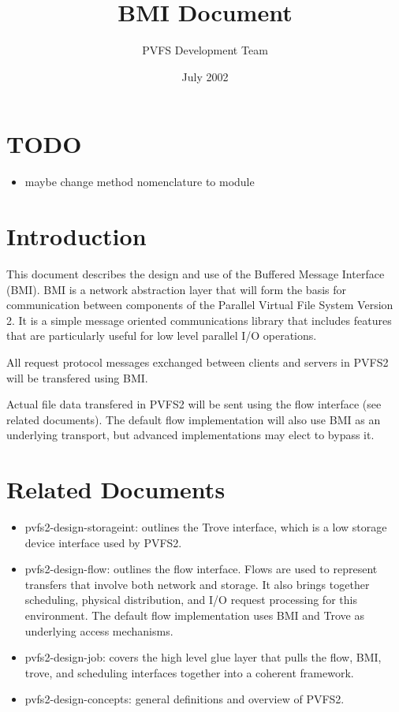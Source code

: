 \documentclass[11pt]{article}
\title{BMI Document}
\author{PVFS Development Team}
\date{July 2002}
\begin{document}
\maketitle

\section{TODO}

\begin{itemize}
\item maybe change method nomenclature to module
\end{itemize}

\section{Introduction}

This document describes the design and use of the Buffered Message
Interface (BMI).  BMI is a network abstraction layer that will form the
basis for communication between components of the Parallel Virtual File
System Version 2.  It is a simple message oriented communications
library that includes features that are particularly useful for
low level parallel I/O operations.

All request protocol messages exchanged between clients and
servers in PVFS2 will be transfered using BMI.

Actual file data transfered in PVFS2 will be sent using the flow
interface (see related documents).  The default flow
implementation will also use BMI as an underlying transport, but
advanced implementations may elect to bypass it.

\section{Related Documents}

\begin{itemize}
\item pvfs2-design-storageint: outlines the Trove interface, which
is a low storage device interface used by PVFS2.  
\item pvfs2-design-flow: outlines the flow interface.  Flows are
used to represent transfers that involve both network and storage.
It also brings together scheduling, physical distribution, and I/O request
processing for this environment.  The default flow implementation
uses BMI and Trove as underlying access mechanisms.
\item pvfs2-design-job: covers the high level glue layer that
pulls the flow, BMI, trove, and scheduling interfaces together
into a coherent framework.
\item pvfs2-design-concepts: general definitions and overview of
PVFS2.
\end{itemize}
\end{document}
